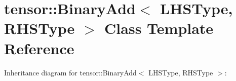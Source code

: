 \hypertarget{classtensor_1_1BinaryAdd}{}\section{tensor\+:\+:Binary\+Add$<$ L\+H\+S\+Type, R\+H\+S\+Type $>$ Class Template Reference}
\label{classtensor_1_1BinaryAdd}


Inheritance diagram for tensor\+:\+:Binary\+Add$<$ L\+H\+S\+Type, R\+H\+S\+Type $>$\+:

